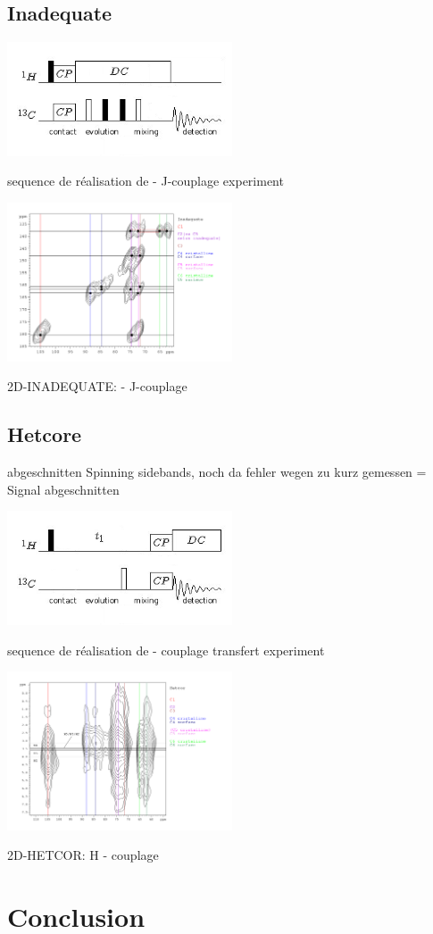 \documentclass[a4paper,12pt]{scrartcl}
\begin{document}
  \subsection{Inadequate}
\begin{figurehere}
    \center
     \includegraphics[width=0.5\textwidth]{bilder/PDSD4.png}
     \caption{sequence de réalisation de  -  J-couplage experiment}
    \end{figurehere}
\begin{figurehere}
    \center
    \includegraphics[width=0.5\textwidth]{bilder/inad.png}
    \caption{2D-INADEQUATE:  -  J-couplage }
   \end{figurehere}
  \subsection{Hetcore}
 
   abgeschnitten Spinning sidebands, noch da fehler wegen zu kurz gemessen = Signal abgeschnitten
\begin{figurehere}
    \center
     \includegraphics[width=0.5\textwidth]{bilder/PDSD3.png}
     \caption{sequence de réalisation de  -  couplage transfert experiment}
    \end{figurehere}
 \begin{figurehere}
    \center
    \includegraphics[width=0.5\textwidth]{bilder/hetcor.png}
    \caption{2D-HETCOR: H -  couplage }
   \end{figurehere}
 

 \section{Conclusion}
 
 
\end{document}
